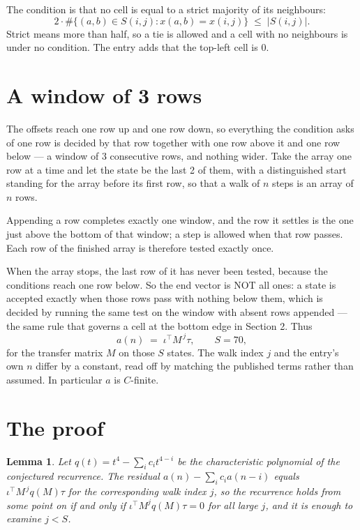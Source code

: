 \documentclass[11pt,a4paper]{article}
\theoremstyle{plain}
\newtheorem{lemma}[theorem]{Lemma}
\theoremstyle{definition}
\begin{document}
The condition is that no cell is equal to a strict majority of its neighbours:
\[
2\cdot\#\{(a,b)\in S(i,j) : x(a,b)=x(i,j)\}\;\le\;|S(i,j)| .
\]
Strict means more than half, so a tie is allowed and a cell with no neighbours is under no condition. The entry adds that the top-left cell is $0$.

\section{A window of 3 rows}

The offsets reach one row up and one row down, so everything the condition asks of one row is
decided by that row together with one row above it and one row below --- a window of
$3$ consecutive rows, and nothing wider. Take the array one row at a time
and let the state be the last 2 of them, with a distinguished start standing for the
array before its first row, so that a walk of $n$ steps is an array of $n$ rows.

Appending a row completes exactly one window, and the row it settles is the one just above the bottom of that window; a step is
allowed when that row passes. Each row of the finished
array is therefore tested exactly once.

When the array stops, the last row of it has never been tested, because the
conditions reach one row below. So the end vector is NOT all ones: a state is accepted exactly when
those rows pass with nothing below them, which is decided by running the same test on the window
with absent rows appended --- the same rule that governs a cell at the bottom edge in
Section 2.
Thus
\[
a(n)\;=\;\iota^{\!\top}M^{\,j}\tau ,\qquad S=70,
\]
for the transfer matrix $M$ on those $S$ states. The walk index $j$ and the entry's own $n$
differ by a constant, read off by matching the published terms rather than assumed. In
particular $a$ is $C$-finite.

\section{The proof}

\begin{lemma}\label{lem:crit}
Let $q(t)=t^{4}-\sum_i c_it^{4-i}$ be the characteristic polynomial of the
conjectured recurrence. The residual $a(n)-\sum_ic_ia(n-i)$ equals
$\iota^{\!\top}M^{\,j}q(M)\tau$ for the corresponding walk index $j$, so the recurrence
holds from some point on if and only if $\iota^{\!\top}M^{j}q(M)\tau=0$ for all large $j$,
and it is enough to examine $j<S$.
\end{lemma}
\end{document}
